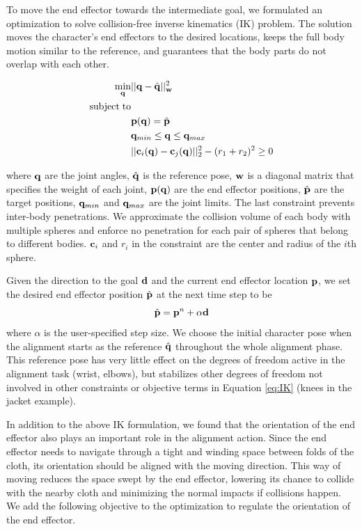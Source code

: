 To move the end effector towards the intermediate goal, we formulated an optimization to solve collision-free inverse kinematics (IK) problem. The solution moves the character's end effectors to the desired locations, keeps the full body motion similar to the reference, and guarantees that the body parts do not overlap with each other.

\begin{align}
\label{eq:IK}
  \min_{\mathbf{q}} & ||\mathbf{q} - \hat{\mathbf{q}}||_{\mathbf{w}}^2 \\
  \nonumber  \mathrm{subject\;} \mathrm{to} & \\
  \nonumber  &\mathbf{p}(\mathbf{q}) = \hat{\mathbf{p}}\\
  \nonumber   &\mathbf{q}_{min} \leq \mathbf{q} \leq \mathbf{q}_{max}\\
  \nonumber   &||\mathbf{c}_i(\mathbf{q}) - \mathbf{c}_j(\mathbf{q})||_2^2 - (r_1 + r_2)^2 \geq 0
\end{align}

where $\mathbf{q}$ are the joint angles, $\hat{\mathbf{q}}$ is the reference pose, $\mathbf{w}$ is a diagonal matrix that specifies the weight of each joint, $\mathbf{p}(\mathbf{q})$ are the end effector positions, $\hat{\mathbf{p}}$ are the target positions, $\mathbf{q}_{min}$ and $\mathbf{q}_{max}$ are the joint limits. The last constraint prevents inter-body penetrations. We approximate the collision volume of each body with multiple spheres and enforce no penetration for each pair of spheres that belong to different bodies. $\mathbf{c}_i$ and $r_i$ in the constraint are the center and radius of the $i$th sphere.

Given the direction to the goal $\mathbf{d}$ and the current end effector location $\mathbf{p}$, we set the desired end effector position $\hat{\mathbf{p}}$ at the next time step to be
\begin{equation}
  \hat{\mathbf{p}} = \mathbf{p}^n+\alpha\mathbf{d}
  \label{eq:target}
\end{equation}
where $\alpha$ is the user-specified step size. We choose the initial character pose when the alignment starts as the reference $\hat{\mathbf{q}}$ throughout the whole alignment phase. This reference pose has very little effect on the degrees of freedom active in the alignment task (\eg wrist, elbows), but stabilizes other degrees of freedom not involved in other constraints or objective terms in Equation \ref{eq:IK} (\eg knees in the jacket example).

In addition to the above IK formulation, we found that the orientation of the end effector also plays an important role in the alignment action. Since the end effector needs to navigate through a tight and winding space between folds of the cloth, its orientation should be aligned with the moving direction. This way of moving reduces the space swept by the end effector, lowering its chance to collide with the nearby cloth and minimizing the normal impacts if collisions happen. We add the following objective to the optimization to regulate the orientation of the end effector.

